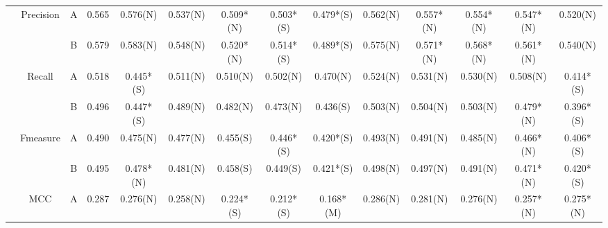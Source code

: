 \begin{table*}
{\begin{tabular}{|c|c|c|c|c|c|c|c|c|c|c|c|c|c|}
                      & \multirow{2}{*}{Precision} & A                                                                             & 0.565         & 0.576(N)             & 0.537(N)         & 0.509*(N)       & 0.503*(S)       & 0.479*(S)         & 0.562(N)        & 0.557*(N)      & 0.554*(N)      & 0.547*(N)        & 0.520(N)       \\ \cline{3-14} 
                      &                            & B                                                                             & 0.579         & 0.583(N)             & 0.548(N)         & 0.520*(N)        & 0.514*(S)       & 0.489*(S)         & 0.575(N)        & 0.571*(N)      & 0.568*(N)      & 0.561*(N)        & 0.540(N)       \\ \cline{2-14} 
                      & \multirow{2}{*}{Recall}    & A                                                                             & 0.518         & 0.445*(S)            & 0.511(N)         & 0.510(N)         & 0.502(N)        & 0.470(N)           & 0.524(N)        & 0.531(N)       & 0.530(N)        & 0.508(N)         & 0.414*(S)     \\ \cline{3-14} 
                      &                            & B                                                                             & 0.496         & 0.447*(S)            & 0.489(N)         & 0.482(N)        & 0.473(N)        & 0.436(S)          & 0.503(N)        & 0.504(N)       & 0.503(N)       & 0.479*(N)        & 0.396*(S)     \\ \cline{2-14} 
                      & \multirow{2}{*}{Fmeasure}  & A                                                                             & 0.490          & 0.475(N)             & 0.477(N)         & 0.455(S)        & 0.446*(S)       & 0.420*(S)          & 0.493(N)        & 0.491(N)       & 0.485(N)       & 0.466*(N)        & 0.406*(S)     \\ \cline{3-14} 
                      &                            & B                                                                             & 0.495         & 0.478*(N)            & 0.481(N)         & 0.458(S)        & 0.449(S)        & 0.421*(S)         & 0.498(N)        & 0.497(N)       & 0.491(N)       & 0.471*(N)        & 0.420*(S)      \\ \cline{2-14} 
                      & \multirow{2}{*}{MCC}       & A                                                                             & 0.287         & 0.276(N)             & 0.258(N)         & 0.224*(S)       & 0.212*(S)       & 0.168*(M)         & 0.286(N)        & 0.281(N)       & 0.276(N)       & 0.257*(N)        & 0.275*(N)     \\ \cline{3-14} 

\end{tabular}}
\end{table*}
